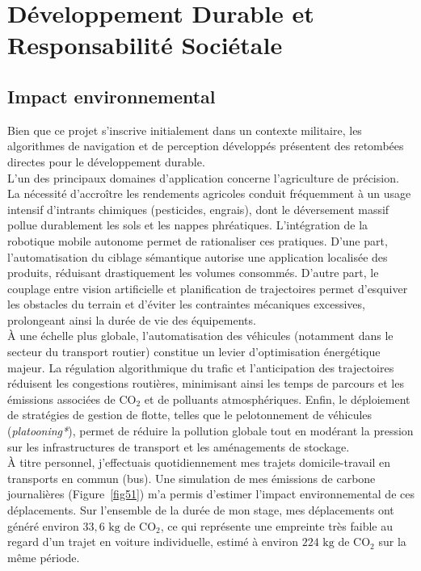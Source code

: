 \newpage
\section*{Développement Durable et Responsabilité Sociétale}


\subsection*{Impact environnemental}

Bien que ce projet s'inscrive initialement dans un contexte militaire, les algorithmes de navigation et de perception développés présentent des retombées directes pour le développement durable.\\

L'un des principaux domaines d'application concerne l'agriculture de précision. La nécessité d'accroître les rendements agricoles conduit fréquemment à un usage intensif d'intrants chimiques (pesticides, engrais), dont le déversement massif pollue durablement les sols et les nappes phréatiques. L'intégration de la robotique mobile autonome permet de rationaliser ces pratiques. D'une part, l'automatisation du ciblage sémantique autorise une application localisée des produits, réduisant drastiquement les volumes consommés. D'autre part, le couplage entre vision artificielle et planification de trajectoires permet d'esquiver les obstacles du terrain et d'éviter les contraintes mécaniques excessives, prolongeant ainsi la durée de vie des équipements.\\

À une échelle plus globale, l'automatisation des véhicules (notamment dans le secteur du transport routier) constitue un levier d'optimisation énergétique majeur. La régulation algorithmique du trafic et l'anticipation des trajectoires réduisent les congestions routières, minimisant ainsi les temps de parcours et les émissions associées de $\text{CO}_2$ et de polluants atmosphériques. Enfin, le déploiement de stratégies de gestion de flotte, telles que le pelotonnement de véhicules (\emph{platooning*}), permet de réduire la pollution globale tout en modérant la pression sur les infrastructures de transport et les aménagements de stockage.\\

À titre personnel, j'effectuais quotidiennement mes trajets domicile-travail en transports en commun (bus). Une simulation de mes émissions de carbone journalières (Figure~\ref{fig51}) m'a permis d'estimer l'impact environnemental de ces déplacements. Sur l'ensemble de la durée de mon stage, mes déplacements ont généré environ $33{,}6\text{ kg}$ de $\text{CO}_2$, ce qui représente une empreinte très faible au regard d'un trajet en voiture individuelle, estimé à environ $224\text{ kg}$ de $\text{CO}_2$ sur la même période.

